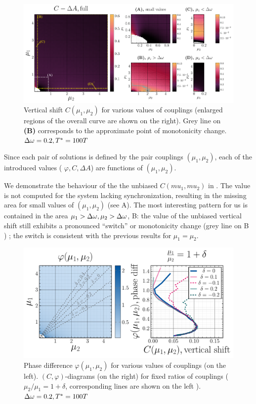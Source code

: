 \documentclass{mynotes}
\begin{document}
\begin{figure}[h!]
      \vspace{-10pt}
      \centering
      \includegraphics[width = 1.0\columnwidth]{figures/vertshift_heatmap.pdf}
      \caption{
            Vertical shift \( C(\mu_1, \mu_2 )\) for various values of couplings (enlarged regions of the overall curve are shown on the right). Grey line on \textbf{(B)} corresponds to the approximate point of monotonicity change. \( \Delta\omega = 0.2, T^* = 100 T  \) \label{fig:C_hm}
      }
\end{figure}

Since each pair of solutions is defined by the pair couplings \( \left( \mu_1, \mu_2 \right) \), each of the introduced values ( \( \varphi, C, \Delta A \)) are functions of  \( \left( \mu_1, \mu_2 \right) \). 

We demonstrate the behaviour of the the unbiased \( C( mu_1, mu_2 )\) in . The value is not computed for the system lacking synchronization, resulting in the missing area for small values of \( ( \mu_1, \mu_2 ) \) (see A). The most interesting pattern for us is contained in the area \( \mu_1 > \Delta\omega , \mu_2 > \Delta\omega\), B: the value of the unbiased vertical shift still exhibits a pronounced ``switch'' or monotonicity change (grey line on  B ) ; the switch is consistent with the previous results for \( \mu_1 = \mu_2 \).

\begin{figure}[h!]
      \centering
      \includegraphics[width = 0.75\columnwidth]{figures/cphi_heatmap.pdf}
      \caption{
            Phase difference \( \varphi(\mu_1, \mu_2 )\) for various values of couplings (on the left). \( (C, \varphi)\)-diagrams (on the right) for fixed ratios of couplings ( \( \mu_2 / \mu_1 = 1 + \delta \), corresponding lines are shown on the left ).
             \( \Delta\omega = 0.2, T^* = 100 T  \) 
            \label{fig:Cphi_hm}
      }
\end{figure}
\end{document}
